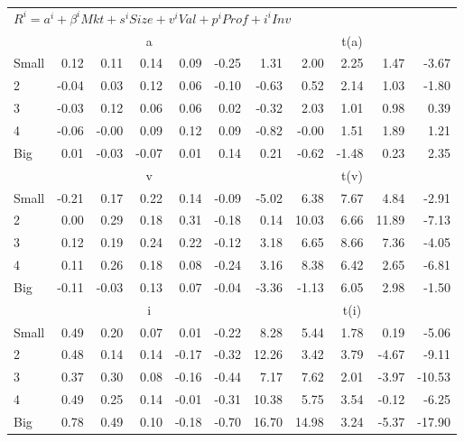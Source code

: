 \begin{table}[!ht]
\begin{tabular}{lrrrrrrrrrr}
    
  \midrule
  \multicolumn{11}{l}{$R^i=a^i+\beta^iMkt+s^iSize+v^iVal+p^iProf+i^iInv$}  \\
  
     & \multicolumn{5}{c}{a} & \multicolumn{5}{c}{t(a)}   \\
     \cmidrule(r){2-6} \cmidrule(r){7-11} 
    Small  & 0.12  & 0.11  & 0.14  & 0.09  & -0.25  & 1.31  & 2.00  & 2.25  & 1.47  & -3.67   \\
    2  & -0.04  & 0.03  & 0.12  & 0.06  & -0.10  & -0.63  & 0.52  & 2.14  & 1.03  & -1.80   \\
    3  & -0.03  & 0.12  & 0.06  & 0.06  & 0.02  & -0.32  & 2.03  & 1.01  & 0.98  & 0.39   \\
    4  & -0.06  & -0.00  & 0.09  & 0.12  & 0.09  & -0.82  & -0.00  & 1.51  & 1.89  & 1.21   \\
    Big  & 0.01  & -0.03  & -0.07  & 0.01  & 0.14  & 0.21  & -0.62  & -1.48  & 0.23  & 2.35   \\
    

     & \multicolumn{5}{c}{v} & \multicolumn{5}{c}{t(v)}   \\
     \cmidrule(r){2-6} \cmidrule(r){7-11} 
    Small  & -0.21  & 0.17  & 0.22  & 0.14  & -0.09  & -5.02  & 6.38  & 7.67  & 4.84  & -2.91   \\
    2  & 0.00  & 0.29  & 0.18  & 0.31  & -0.18  & 0.14  & 10.03  & 6.66  & 11.89  & -7.13   \\
    3  & 0.12  & 0.19  & 0.24  & 0.22  & -0.12  & 3.18  & 6.65  & 8.66  & 7.36  & -4.05   \\
    4  & 0.11  & 0.26  & 0.18  & 0.08  & -0.24  & 3.16  & 8.38  & 6.42  & 2.65  & -6.81   \\
    Big  & -0.11  & -0.03  & 0.13  & 0.07  & -0.04  & -3.36  & -1.13  & 6.05  & 2.98  & -1.50   \\
  

     & \multicolumn{5}{c}{i} & \multicolumn{5}{c}{t(i)}   \\
     \cmidrule(r){2-6} \cmidrule(r){7-11} 
    Small  & 0.49  & 0.20  & 0.07  & 0.01  & -0.22  & 8.28  & 5.44  & 1.78  & 0.19  & -5.06   \\
    2  & 0.48  & 0.14  & 0.14  & -0.17  & -0.32  & 12.26  & 3.42  & 3.79  & -4.67  & -9.11   \\
    3  & 0.37  & 0.30  & 0.08  & -0.16  & -0.44  & 7.17  & 7.62  & 2.01  & -3.97  & -10.53   \\
    4  & 0.49  & 0.25  & 0.14  & -0.01  & -0.31  & 10.38  & 5.75  & 3.54  & -0.12  & -6.25   \\
    Big  & 0.78  & 0.49  & 0.10  & -0.18  & -0.70  & 16.70  & 14.98  & 3.24  & -5.37  & -17.90   \\
    
  \bottomrule
\end{tabular}
\label{tbl:Size_Inv}
\end{table}
